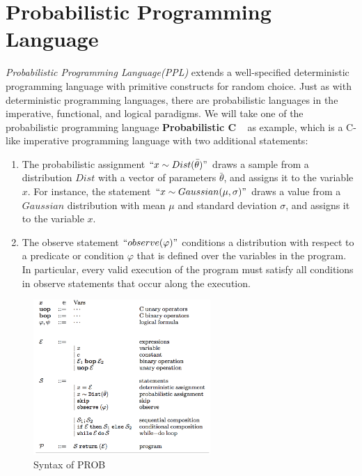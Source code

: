 \section{Probabilistic Programming Language}
\label{sec:language}
\textit{Probabilistic Programming Language(PPL)} extends a well-specified deterministic programming language with primitive constructs for random choice. Just as with deterministic programming languages, there are probabilistic languages in the imperative, functional, and logical paradigms. We will take one of the probabilistic programming language \textbf{Probabilistic C} ~\cite{probc} as example, which is a C-like imperative programming language with two additional statements:
\begin{enumerate}
  \item The probabilistic assignment $``x \sim Dist(\bar{\theta})"$ draws a sample from a distribution $Dist$ with a vector of parameters $\bar{\theta}$, and assigns it to the variable $x$. For instance, the statement $``x \sim Gaussian(\mu, \sigma)"$ draws a value from a $Gaussian$ distribution with mean $\mu$ and standard deviation $\sigma$, and assigns it to the variable $x$.
  \item The observe statement $``observe(\varphi)"$ conditions a distribution with respect to a predicate or condition $\varphi$ that is defined over the variables in the program. In particular, every valid execution of the program must satisfy all conditions in observe statements that occur along the execution.
\end{enumerate}

\begin{figure}
    \centering
    \includegraphics[width=0.6\textwidth]{figures/prob_syntax.png}
    \caption{Syntax of PROB}
    \label{fig:prob_syntax}
\end{figure}

